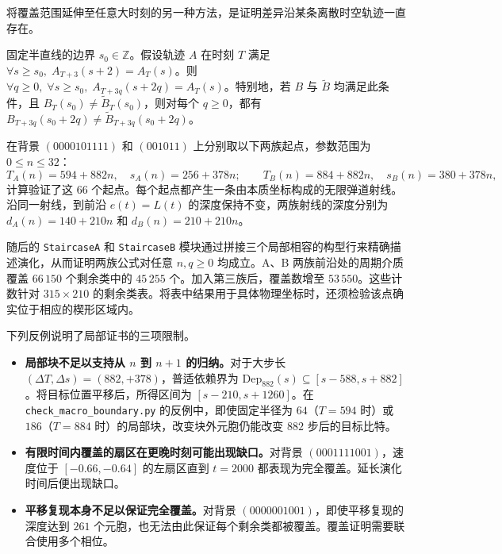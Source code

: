 将覆盖范围延伸至任意大时刻的另一种方法，是证明差异沿某条离散时空轨迹一直存在。

\begin{lemma}[右半直线上的持续性]\label{lem:ballistic_ray}
固定半直线的边界 $s_0\in\mathbb Z$。假设轨迹 $A$ 在时刻 $T$ 满足 $\forall s \ge s_0,\; A_{T+3}(s + 2) = A_T(s)$。则 $\forall q \ge 0,\; \forall s \ge s_0,\; A_{T+3q}(s + 2q) = A_T(s)$。特别地，若 $B$ 与 $\widetilde B$ 均满足此条件，且 $B_T(s_0) \ne \widetilde B_T(s_0)$，则对每个 $q \ge 0$，都有 $B_{T+3q}(s_0 + 2q) \ne \widetilde B_{T+3q}(s_0 + 2q)$。
\end{lemma}

在背景 $(0000101111)$ 和 $(001011)$ 上分别取以下两族起点，参数范围为 $0 \le n \le 32$：
\begin{equation}
T_A(n) = 594 + 882n,\quad s_A(n) = 256 + 378n; \qquad
T_B(n) = 884 + 882n,\quad s_B(n) = 380 + 378n,
\end{equation}
计算验证了这 $66$ 个起点。每个起点都产生一条由本质坐标构成的无限弹道射线。沿同一射线，到前沿 $e(t) = L(t)$ 的深度保持不变，两族射线的深度分别为 $d_A(n) = 140 + 210n$ 和 $d_B(n) = 210 + 210n$。

随后的 \texttt{StaircaseA} 和 \texttt{StaircaseB} 模块通过拼接三个局部相容的构型行来精确描述演化，从而证明两族公式对任意 $n,q\ge0$ 均成立。A、B 两族前沿处的周期介质覆盖 $66\,150$ 个剩余类中的 $45\,255$ 个。加入第三族后，覆盖数增至 $53\,550$。这些计数针对 $315\times210$ 的剩余类表。将表中结果用于具体物理坐标时，还须检验该点确实位于相应的楔形区域内。

下列反例说明了局部证书的三项限制。
\begin{itemize}
    \item \textbf{局部块不足以支持从 $n$ 到 $n+1$ 的归纳。}对于大步长 $(\Delta T, \Delta s) = (882, +378)$，普适依赖界为 $\mathrm{Dep}_{882}(s) \subseteq [s - 588, s + 882]$。将目标位置平移后，所得区间为 $[s - 210, s + 1260]$。在 \texttt{check\_macro\_boundary.py} 的反例中，即使固定半径为 $64$（$T=594$ 时）或 $186$（$T=884$ 时）的局部块，改变块外元胞仍能改变 $882$ 步后的目标比特。
    \item \textbf{有限时间内覆盖的扇区在更晚时刻可能出现缺口。}对背景 $(0001111001)$，速度位于 $[-0.66, -0.64]$ 的左扇区直到 $t = 2000$ 都表现为完全覆盖。延长演化时间后便出现缺口。
    \item \textbf{平移复现本身不足以保证完全覆盖。}对背景 $(0000001001)$，即使平移复现的深度达到 $261$ 个元胞，也无法由此保证每个剩余类都被覆盖。覆盖证明需要联合使用多个相位。
\end{itemize}

